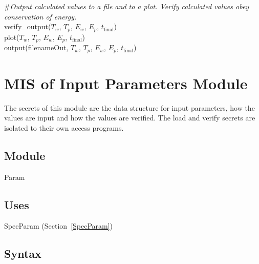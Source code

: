 \documentclass[12pt, titlepage]{article}
\begin{document}
\noindent \#\textit{Output calculated values to a file and to a plot.  Verify
  calculated values obey conservation of energy.}\\

\noindent verify\_output($T_w$, $T_p$, $E_w$, $E_p$, $t_\text{final}$)\\

\noindent plot($T_w$, $T_p$, $E_w$, $E_p$, $t_\text{final}$)\\

\noindent output(filenameOut, $T_w$, $T_p$, $E_w$, $E_p$, $t_\text{final}$)\\

\newpage

\section{MIS of Input Parameters Module} \label{Parameters}

The secrets of this module are the data structure for input parameters, how the
values are input and how the values are verified.  The load and verify secrets
are isolated to their own access programs.

\subsection{Module}

Param

\subsection{Uses}

SpecParam (Section~\ref{SpecParam})

\subsection{Syntax}
\end{document}
